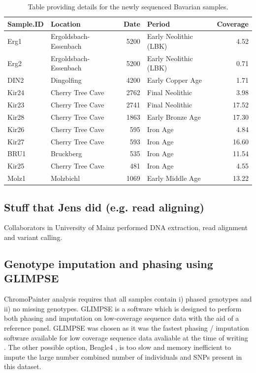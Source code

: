 \begin{table}
\small
\centering
\begin{tabular}{l|l|r|l|r}
\hline
Sample.ID & Location & Date & Period & Coverage \\
\hline
Erg1 & Ergoldsbach-Essenbach & 5200 & Early Neolithic (LBK) & 4.52\\
\hline
Erg2 & Ergoldsbach-Essenbach & 5200 & Early Neolithic (LBK) & 0.71\\
\hline
DIN2 & Dingolfing & 4200 & Early Copper Age & 1.71\\
\hline
Kir24 & Cherry Tree Cave & 2762 & Final Neolithic & 3.98\\
\hline
Kir23 & Cherry Tree Cave & 2741 & Final Neolithic & 17.52\\
\hline
Kir28 & Cherry Tree Cave & 1863 & Early Bronze Age & 17.30\\
\hline
Kir26 & Cherry Tree Cave & 595 & Iron Age & 4.84\\
\hline
Kir27 & Cherry Tree Cave & 593 & Iron Age & 16.60\\
\hline
BRU1 & Bruckberg & 535 & Iron Age & 11.54\\
\hline
Kir25 & Cherry Tree Cave & 481 & Iron Age & 4.55\\
\hline
Molz1 & Molzbichl & 1069 & Early Middle Age & 13.22\\
\hline
\end{tabular}
\caption{Table providing details for the newly sequenced Bavarian samples.}
\end{table}

\subsection{Stuff that Jens did (e.g. read aligning)}

Collaborators in University of Mainz performed DNA extraction, read alignment and variant calling. 

\subsection{Genotype imputation and phasing using GLIMPSE}
\label{sssec:imputationphasingGLIMPSE}

ChromoPainter analysis requires that all samples contain i) phased genotypes and ii) no missing genotypes. GLIMPSE \cite{rubinacci2021efficient} is a software which is designed to perform both phasing and imputation on low-coverage sequence data with the aid of a reference panel. GLIMPSE was chosen as it was the fastest phasing / imputation software available for low coverage sequence data avaliable at the time of writing \cite{rubinacci2021efficient}. The other possible option, Beagle4 \cite{Browning2007}, is too slow and memory inefficient to impute the large number combined number of individuals and SNPs present in this dataset. 


